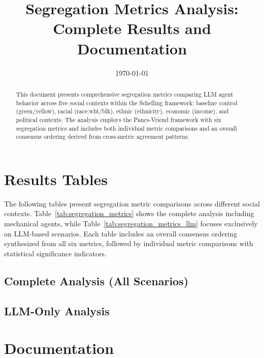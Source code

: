 \documentclass[11pt]{article}
\begin{document}
\title{Segregation Metrics Analysis: Complete Results and Documentation}
\author{}
\date{\today}
\maketitle

\begin{abstract}
This document presents comprehensive segregation metrics comparing LLM agent behavior across five social contexts within the Schelling framework: baseline control (green/yellow), racial (race:wht/blk), ethnic (ethnicity), economic (income), and political contexts. The analysis employs the Pancs-Vriend framework with six segregation metrics and includes both individual metric comparisons and an overall consensus ordering derived from cross-metric agreement patterns.
\end{abstract}

\tableofcontents
\newpage

\section{Results Tables}

The following tables present segregation metric comparisons across different social contexts. Table~\ref{tab:segregation_metrics} shows the complete analysis including mechanical agents, while Table~\ref{tab:segregation_metrics_llm} focuses exclusively on LLM-based scenarios. Each table includes an overall consensus ordering synthesized from all six metrics, followed by individual metric comparisons with statistical significance indicators.

\subsection{Complete Analysis (All Scenarios)}



\newpage

\subsection{LLM-Only Analysis}



\newpage

\section{Documentation}
\end{document}
